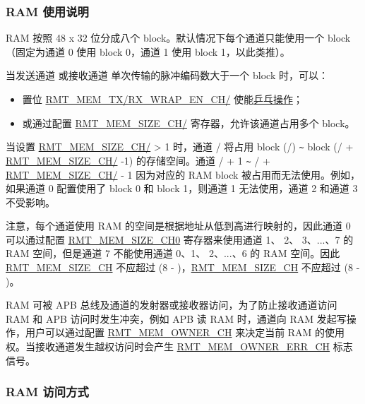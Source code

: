 \documentclass[main\_\_CN.tex]{subfiles}
\begin{document}
\subsubsection{RAM 使用说明}

RAM 按照 48 x 32 位分成八个 block。默认情况下每个通道只能使用一个 block（固定为通道 0 使用 block 0，通道 1 使用 block 1，以此类推）。

当发送通道  或接收通道  单次传输的脉冲编码数大于一个 block 时，可以：
\begin{itemize}
    \item 置位 \hyperref[fielddesc:RMTMEMTXWRAPENCHN]{RMT\_MEM\_TX/RX\_WRAP\_EN\_CH/} 使能\hyperref[sec:wrap-tx-mode]{乒乓操作}；
    \item 或通过配置 \hyperref[fielddesc:RMTMEMSIZECHN]{RMT\_MEM\_SIZE\_CH/} 寄存器，允许该通道占用多个 block。
\end{itemize}

当设置 \hyperref[fielddesc:RMTMEMSIZECHN]{RMT\_MEM\_SIZE\_CH/} > 1 时，通道 / 将占用 block (/) \verb+~+ block (/ + \hyperref[fielddesc:RMTMEMSIZECHN]{RMT\_MEM\_SIZE\_CH/} -1) 的存储空间。通道 / + 1 \verb+~+ / + \hyperref[fielddesc:RMTMEMSIZECHN]{RMT\_MEM\_SIZE\_CH/} - 1 因为对应的 RAM block 被占用而无法使用。例如，如果通道 0 配置使用了 block 0 和 block 1，则通道 1 无法使用，通道 2 和通道 3 不受影响。

注意，每个通道使用 RAM 的空间是根据地址从低到高进行映射的，因此通道 0 可以通过配置 \hyperref[fielddesc:RMTMEMSIZECHN]{RMT\_MEM\_SIZE\_CH0} 寄存器来使用通道 1、 2、 3、...、7 的 RAM 空间，但是通道 7 不能使用通道 0、1、 2、...、6 的 RAM 空间。因此 \hyperref[fielddesc:RMTMEMSIZECHN]{RMT\_MEM\_SIZE\_CH} 不应超过 (8 - )，\hyperref[fielddesc:RMTMEMSIZECHM]{RMT\_MEM\_SIZE\_CH} 不应超过 (8 - )。

RAM 可被 APB 总线及通道的发射器或接收器访问，为了防止接收通道访问 RAM 和 APB 访问时发生冲突，例如 APB 读 RAM 时，通道向 RAM 发起写操作，用户可以通过配置 \hyperref[fielddesc:RMTMEMOWNERCHM]{RMT\_MEM\_OWNER\_CH} 来决定当前 RAM 的使用权。当接收通道发生越权访问时会产生 \hyperref[fielddesc:RMTMEMOWNERERRCHM]{RMT\_MEM\_OWNER\_ERR\_CH} 标志信号。

\subsubsection{RAM 访问方式}
\end{document}
